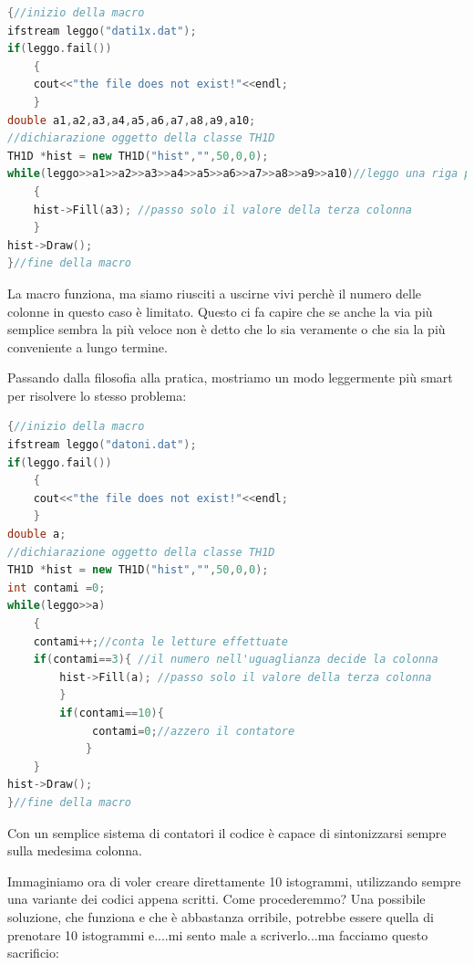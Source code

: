 \documentclass[11pt,fleqn]{book} %
\begin{document}
\begin{lstlisting}[language=c++]
{//inizio della macro
ifstream leggo("dati1x.dat");
if(leggo.fail())
    {
    cout<<"the file does not exist!"<<endl;
    }
double a1,a2,a3,a4,a5,a6,a7,a8,a9,a10;
//dichiarazione oggetto della classe TH1D
TH1D *hist = new TH1D("hist","",50,0,0);
while(leggo>>a1>>a2>>a3>>a4>>a5>>a6>>a7>>a8>>a9>>a10)//leggo una riga per volta
    {
    hist->Fill(a3); //passo solo il valore della terza colonna  
    }
hist->Draw();
}//fine della macro
\end{lstlisting}

La macro funziona, ma siamo riusciti a uscirne vivi perchè il numero delle colonne in questo caso è limitato. Questo ci fa capire che se anche la via più semplice sembra la più veloce non è detto che lo sia veramente o che sia la più conveniente a lungo termine.

Passando dalla filosofia alla pratica, mostriamo un modo leggermente più smart per risolvere lo stesso problema:

\begin{lstlisting}[language=c++]
{//inizio della macro
ifstream leggo("datoni.dat");
if(leggo.fail())
    {
    cout<<"the file does not exist!"<<endl;
    }
double a;
//dichiarazione oggetto della classe TH1D
TH1D *hist = new TH1D("hist","",50,0,0);
int contami =0;
while(leggo>>a)
    {
    contami++;//conta le letture effettuate
    if(contami==3){ //il numero nell'uguaglianza decide la colonna
        hist->Fill(a); //passo solo il valore della terza colonna
        }
        if(contami==10){
             contami=0;//azzero il contatore
            }
    }
hist->Draw();
}//fine della macro
\end{lstlisting}

Con un semplice sistema di contatori il codice è capace di sintonizzarsi sempre sulla medesima colonna.

Immaginiamo ora di voler creare direttamente 10 istogrammi, utilizzando sempre una variante dei codici appena scritti. Come procederemmo?
Una possibile soluzione, che funziona e che è abbastanza orribile, potrebbe essere quella di prenotare 10 istogrammi e....mi sento male a scriverlo...ma facciamo questo sacrificio:
\end{document}
